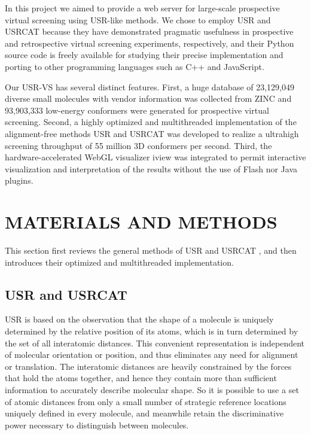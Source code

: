 \documentclass[a4,center,fleqn]{NAR}
\begin{document}
In this project we aimed to provide a web server for large-scale prospective virtual screening using USR-like methods. We chose to employ USR \cite{1379} and USRCAT \cite{1331} because they have demonstrated pragmatic usefulness in prospective \cite{1380,1281,1504,1502,1615} and retrospective \cite{1331} virtual screening experiments, respectively, and their Python source code is freely available for studying their precise implementation and porting to other programming languages such as C++ and JavaScript.

Our USR-VS has several distinct features. First, a huge database of 23,129,049 diverse small molecules with vendor information was collected from ZINC \cite{532,1178} and 93,903,333 low-energy conformers were generated for prospective virtual screening. Second, a highly optimized and multithreaded implementation of the alignment-free methods USR \cite{1379} and USRCAT \cite{1331} was developed to realize a ultrahigh screening throughput of 55 million 3D conformers per second. Third, the hardware-accelerated WebGL visualizer iview \cite{1366} was integrated to permit interactive visualization and interpretation of the results without the use of Flash nor Java plugins.

\section{MATERIALS AND METHODS}

This section first reviews the general methods of USR \cite{1379} and USRCAT \cite{1331}, and then introduces their optimized and multithreaded implementation.

\subsection{USR and USRCAT}

USR is based on the observation that the shape of a molecule is uniquely determined by the relative position of its atoms, which is in turn determined by the set of all interatomic distances. This convenient representation is independent of molecular orientation or position, and thus eliminates any need for alignment or translation. The interatomic distances are heavily constrained by the forces that hold the atoms together, and hence they contain more than sufficient information to accurately describe molecular shape. So it is possible to use a set of atomic distances from only a small number of strategic reference locations uniquely defined in every molecule, and meanwhile retain the discriminative power necessary to distinguish between molecules.
\end{document}
